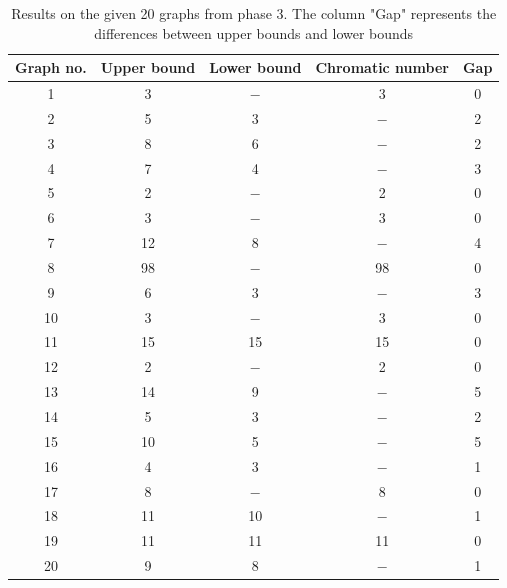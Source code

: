 \documentclass[a4paper]{report}
\begin{document}
		\begin{table} [h!]
		\begin{center}
			\begin{tabular}{| c | c | c | c |c|}
				\hline
				Graph no. & Upper bound & Lower bound & Chromatic number & Gap \\
				\hline
				1 & 3 & $-$ & 3 & 0\\
				\hline
				2 & 5 & 3 & $-$ & 2\\
				\hline
				3 & 8 & 6 & $-$ & 2\\
				\hline
				4 & 7 & 4 & $-$ & 3\\
				\hline
				5 & 2 & $-$ & 2 & 0\\
				\hline
				6 & 3 & $-$ & 3 & 0\\
				\hline
				7 & 12 & 8 & $-$ & 4\\
				\hline
				8 & 98 & $-$ & 98 & 0\\
				\hline
				9 & 6 & 3 & $-$ & 3\\
				\hline
				10 & 3 & $-$ & 3 & 0\\
				\hline
				11 & 15 & 15 & 15 & 0\\
				\hline
				12 & 2 & $-$ & 2 & 0\\
				\hline
				13 & 14 & 9 & $-$ & 5\\
				\hline
				14 & 5 & 3 & $-$ & 2\\
				\hline
				15 & 10 & 5 & $-$ & 5\\
				\hline
				16 & 4 & 3 & $-$ & 1\\
				\hline
				17 & 8 & $-$ & 8 & 0\\
				\hline
				18 & 11 & 10 & $-$ & 1\\
				\hline
				19 & 11 & 11 & 11 & 0\\
				\hline
				20 & 9 & 8 & $-$ & 1\\
				\hline
			\end{tabular}
		\end{center}
		\caption{Results on the given 20 graphs from phase 3. The column "Gap" represents the differences between upper bounds and lower bounds}
		\label{tab:result}
	\end{table}
	
\end{document}
